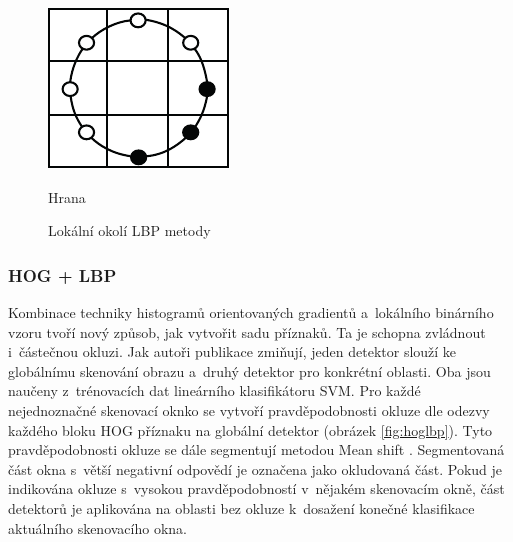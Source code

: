 \begin{figure}[H]
\begin{minipage}[b]{.18\textwidth}
  \includegraphics[width=.9\linewidth]{figures/lbp_edge}
  \caption*{Hrana}
\end{minipage}
\caption{Lokální okolí LBP metody \cite{lbp:orig}}
\label{fig:lbpvzory}
\end{figure}

\subsubsection*{HOG + LBP}
Kombinace techniky histogramů orientovaných gradientů a~lokálního binárního vzoru tvoří nový způsob, jak vytvořit sadu příznaků. Ta je schopna zvládnout i~částečnou okluzi. Jak autoři publikace \cite{hoglpb} zmiňují, jeden detektor slouží ke globálnímu skenování obrazu a~druhý detektor pro konkrétní oblasti. Oba jsou naučeny z~trénovacích dat lineárního klasifikátoru SVM. Pro každé nejednoznačné skenovací oknko se vytvoří pravděpodobnosti okluze dle odezvy každého bloku HOG příznaku na globální detektor (obrázek \ref{fig:hoglbp}). Tyto pravděpodobnosti okluze se dále segmentují metodou Mean shift \cite{meanshift1, meanshift2}. Segmentovaná část okna s~větší negativní odpovědí je označena jako okludovaná část. Pokud je indikována okluze s~vysokou pravděpodobností v~nějakém skenovacím okně, část detektorů je aplikována na oblasti bez okluze k~dosažení konečné klasifikace aktuálního skenovacího okna. 

